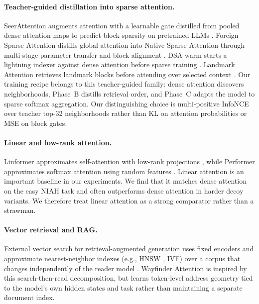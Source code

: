 \documentclass{article}
\begin{document}
\paragraph{Teacher-guided distillation into sparse attention.}
SeerAttention augments attention with a learnable gate distilled from pooled dense attention maps to predict block sparsity on pretrained LLMs \cite{gao2024seerattention}. Foreign Sparse Attention distills global attention into Native Sparse Attention through multi-stage parameter transfer and block alignment \cite{sundarapandiyan2025fsa}. DSA warm-starts a lightning indexer against dense attention before sparse training \cite{deepseek2025v32}. Landmark Attention retrieves landmark blocks before attending over selected context \cite{mohtashami2023landmark}. Our training recipe belongs to this teacher-guided family: dense attention discovers neighborhoods, Phase~B distills retrieval order, and Phase~C adapts the model to sparse softmax aggregation. Our distinguishing choice is multi-positive InfoNCE over teacher top-32 neighborhoods rather than KL on attention probabilities or MSE on block gates.

\paragraph{Linear and low-rank attention.}
Linformer approximates self-attention with low-rank projections \cite{wang2020linformer}, while Performer approximates softmax attention using random features \cite{choromanski2021performer}. Linear attention is an important baseline in our experiments. We find that it matches dense attention on the easy NIAH task and often outperforms dense attention in harder decoy variants. We therefore treat linear attention as a strong comparator rather than a strawman.

\paragraph{Vector retrieval and RAG.}
External vector search for retrieval-augmented generation uses fixed encoders and approximate nearest-neighbor indexes (e.g., HNSW \cite{malkov2018hnsw}, IVF) over a corpus that changes independently of the reader model \cite{lewis2020rag,johnson2019faiss}. Wayfinder Attention is inspired by this search-then-read decomposition, but learns token-level address geometry tied to the model's own hidden states and task rather than maintaining a separate document index.
\end{document}
